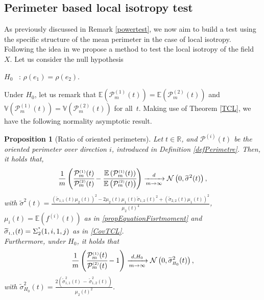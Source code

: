 \documentclass[12pt]{article}
\renewcommand{\tilde}{\widetilde}
\theoremstyle{Theorem}
\newtheorem{Proposition}[Theorem]{Proposition}
\theoremstyle{definition}
\begin{document}
\subsection{Perimeter based local isotropy test}
As previously discussed in Remark \ref{powertest}, we now aim to build a test using the specific structure of the mean perimeter in the case of local isotropy. Following the idea  in \cite{bierme2019}  we propose a method to test the local isotropy of the field $X$.
Let us consider the null hypothesis
\begin{center}
  $H_{0}$ \, :\; $\rho(e_1) = \rho(e_2)$.
\end{center}
Under $H_{0}$, let us remark that $\mathbb{E}\left(\mathcal{P}^{\scriptscriptstyle  (1) }_{m}(t) \right)= \mathbb{E}\left(\mathcal{P}^{\scriptscriptstyle  (2) }_{m}(t)\right)$ and $\mathbb{V}\left(\mathcal{P}^{\scriptscriptstyle  (1) }_{m}(t) \right)= \mathbb{V}\left(\mathcal{P}^{\scriptscriptstyle  (2) }_{m}(t)\right)$ for all~$t$. Making use of Theorem \ref{TCL}, we have the following normality asymptotic result. 
\begin{Proposition}[Ratio of oriented perimeters]\label{deltamethodgeneralprop} 
Let  $t \in \mathbb{R}$, and $\mathcal{P}^{\scriptscriptstyle  (i) }(t)$ be the oriented perimeter over direction $i$, introduced in Definition \ref{defPerimetre}. Then, it holds that,
\begin{equation*}
\frac{1}{m}\left(\cfrac{\mathcal{P}^{\scriptscriptstyle  (1) }_{m}(t)}{\mathcal{P}^{\scriptscriptstyle  (2)}_{m}(t)} - \cfrac{\mathbb{E}\left(\mathcal{P}^{\scriptscriptstyle  (1) }_{m}(t)\right)}{\mathbb{E}\left(\mathcal{P}^{\scriptscriptstyle  (2)}_{m}(t)\right)} \right)  \xrightarrow[m \to \infty]{d} \mathcal{N}\left(0,  \tilde{\sigma}^{2}(t) \right),
\end{equation*}
with $\tilde{\sigma}^{2}(t) = \frac{(\tilde{\sigma}_{\scriptscriptstyle 1,1}(t)\mu_{2}(t))^{2} - 2\mu_{2}(t)\mu_{1}(t)\tilde{\sigma}_{\scriptscriptstyle 1,2}(t)^{2} +(\tilde{\sigma}_{\scriptscriptstyle 2,2}(t)\mu_{1}(t))^{2}}{\mu_{2}(t)^4}$, $\mu_{i}(t) = \mathbb{E}(f^{(i)}(t))$ as in \eqref{propEquationFisrtmoment} \linebreak and $\tilde{\sigma}_{\scriptscriptstyle 1,1}(t) = \Sigma^{\textcolor{white}{ }^{\star}}_{2}(1,i,1,j)$ as in \eqref{CovTCL}. \\
Furthermore, under $H_{0}$, it holds that
\begin{equation}\label{ratiounderH0}
\frac{1}{m}\left(\cfrac{\mathcal{P}^{\scriptscriptstyle  (1) }_{m}(t)}{\mathcal{P}^{\scriptscriptstyle  (2) }_{m}(t)} - 1 \right)  \xrightarrow[m \to \infty]{d, H_0} \mathcal{N}\left(0,  \tilde{\sigma}_{\scriptscriptstyle H_{0}}^{2}(t)  \right),
\end{equation} 
with $\tilde{\sigma}_{\scriptscriptstyle H_{0}}^{2}(t) = \frac{2\left(\tilde{\sigma}_{\scriptscriptstyle 1,1}^{2}(t) \, - \, \tilde{\sigma}_{\scriptscriptstyle 1,2}^{2}(t)\right)}{\mu_{2}(t)^2}$.
\end{Proposition}
\end{document}
